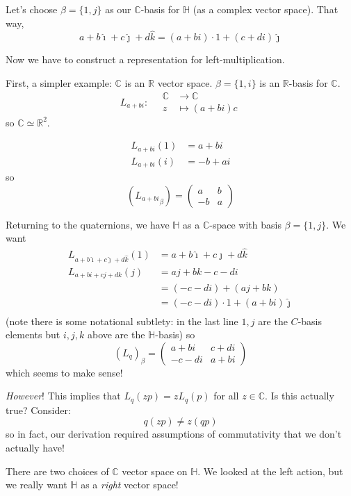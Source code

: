 \documentclass[12pt]{article}
\renewcommand{\hat}[1]{\widehat{#1}}
\newcommand{\R}{\mathbb{R}}
\newcommand{\C}{\mathbb{C}}
\renewcommand{\H}{\mathbb{H}}
\newcommand{\ihat}{\hat{\imath}}
\newcommand{\jhat}{\hat{\jmath}}
\newcommand{\khat}{\hat{k}}
\begin{document}
    Let's choose $\beta = \{1, j\}$ as our $\C$-basis for $\H$ (as a complex vector space). That way, 
    \[a + b\ihat + c\jhat + d\khat = (a + bi)\cdot 1 + (c + di)\jhat\]

    Now we have to construct a representation for left-multiplication.

    First, a simpler example: $\C$ is an $\R$ vector space. $\beta = \{1, i\}$ is an $\R$-basis for $\C$. 
    \[L_{a + bi}: \quad \begin{aligned}
        \C &\to \C\\ 
        z &\mapsto (a + bi)c
    \end{aligned}\] 
    so $\C \simeq \R^2$. 

    \begin{align*}
        L_{a+bi}(1) &= a + bi\\ 
        L_{a+bi}(i) &= -b + ai
    \end{align*}
    so 
    \[({L_{a+bi}}_{\beta}) = \begin{pmatrix}
        a & b\\ 
        -b & a
    \end{pmatrix}\]

    Returning to the quaternions, we have $\H$ as a $\C$-space with basis $\beta =\{1, j\}$. We want 
    \begin{align*}
        L_{a + b\ihat + c\jhat + d\khat}(1) &= a + b\ihat + c\jhat + d\khat\\ 
        L_{a +bi + cj + dk}(j) &= aj + bk -c - di\\ 
            &= (-c - di) + (aj + bk)\\ 
            &= (-c - di)\cdot 1 + (a + bi)\jhat\\
    \end{align*}
    (note there is some notational subtlety: in the last line $1, j$ are the $C$-basis elements but $i, j, k$ above are the $\H$-basis) 
    so 
    \[(L_q)_{\beta} = \begin{pmatrix}
        a + bi & c + di\\ 
        -c - di & a + bi
    \end{pmatrix}\]
    which seems to make sense! 

    \emph{However}! This implies that $L_q(zp) = zL_q(p)$ for all $z \in \C$. Is this actually true? Consider:
    \[q(zp) \neq z(qp)\]
    so in fact, our derivation required assumptions of commutativity that we don't actually have! 
    
    There are two choices of $\C$ vector space on $\H$. We looked at the left action, but we really want $\H$ as a \emph{right} vector space!
 
\end{document}
